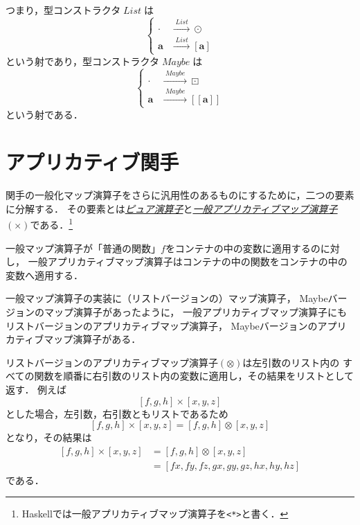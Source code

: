 \documentclass[a5paper,draft]{jsbook}
\def\[{\left[\!\left[}
\def\]{\right]\!\right]}
\newcommand{\programminglanguage}[1]{\textsf{#1}}
\newcommand{\haskell}{\programminglanguage{Haskell}}
\newcommand{\keyword}[1]{{\underline{\emph{#1}}}}
\newcommand{\code}[1]{\texttt{#1}}
\newcommand{\mathTypeParameter}[1]{\mathbf{#1}}
\newcommand{\mathTypeConstructor}[1]{\mathit{#1}} %
\newcommand{\mathListWith}[1]{\left[#1\right]}
\newcommand{\mathListType}[1]{\left[#1\right]}
\newcommand{\mathMaybeType}[1]{\[#1\]}
\DeclareMathOperator{\mathList}{\mathTypeConstructor{List}}
\DeclareMathOperator{\mathMaybe}{\mathTypeConstructor{Maybe}}
\newcommand{\mathBinaryOperator}[1]{\operatorname{#1}}
\newcommand{\mathApplicativeGeneralMap}{\times}
\newcommand{\mathApplicativeMap}{\otimes}
\newcommand{\mathGeneralMap}{\mathBinaryOperator{\cdot}}
\newcommand{\mathMap}{\mathBinaryOperator{\odot}}
\newcommand{\mathMaybeMap}{\mathBinaryOperator{\boxdot}}
\begin{document}
\newcommand{\mathEmptySet}{\emptyset}
つまり，型コンストラクタ$\mathList$は
\begin{equation}
\left\{
\begin{split}
\mathGeneralMap&\xrightarrow{\;\mathList\;}\mathMap\\
\mathTypeParameter{a}&\xrightarrow{\;\mathList\;}\mathListType{\mathTypeParameter{a}}
\end{split}
\right.
\end{equation}
という射であり，型コンストラクタ$\mathMaybe$は
\begin{equation}
\left\{
\begin{split}
\mathGeneralMap&\xrightarrow{\;\mathMaybe\;}\mathMaybeMap\\
\mathTypeParameter{a}&\xrightarrow{\;\mathMaybe\;}\mathMaybeType{\mathTypeParameter{a}}
\end{split}
\right.
\end{equation}
という射である．

\section{アプリカティブ関手}

関手の一般化マップ演算子をさらに汎用性のあるものにするために，二つの要素に分解する．
その要素とは\keyword{ピュア演算子}と\keyword{一般アプリカティブマップ演算子}$(\mathApplicativeGeneralMap)$である．\footnote{\haskell では一般アプリカティブマップ演算子を\code{<*>}と書く．}

一般マップ演算子が「普通の関数」$f$をコンテナの中の変数に適用するのに対し，
一般アプリカティブマップ演算子はコンテナの中の関数をコンテナの中の変数へ適用する．

一般マップ演算子の実装に（リストバージョンの）マップ演算子，
Maybeバージョンのマップ演算子があったように，
一般アプリカティブマップ演算子にもリストバージョンのアプリカティブマップ演算子，
Maybeバージョンのアプリカティブマップ演算子がある．

リストバージョンのアプリカティブマップ演算子$(\mathApplicativeMap)$は左引数のリスト内の
すべての関数を順番に右引数のリスト内の変数に適用し，その結果をリストとして返す．
例えば
$$
\mathListWith{f,g,h}\mathApplicativeGeneralMap\mathListWith{x,y,z}
$$
とした場合，左引数，右引数ともリストであるため
$$
\mathListWith{f,g,h}\mathApplicativeGeneralMap\mathListWith{x,y,z}
=\mathListWith{f,g,h}\mathApplicativeMap\mathListWith{x,y,z}
$$
となり，その結果は
\begin{align}
\mathListWith{f,g,h}\mathApplicativeGeneralMap\mathListWith{x,y,z}
&=\mathListWith{f,g,h}\mathApplicativeMap\mathListWith{x,y,z}\\
&=\mathListWith{fx,fy,fz,gx,gy,gz,hx,hy,hz}
\end{align}
である．
\end{document}
